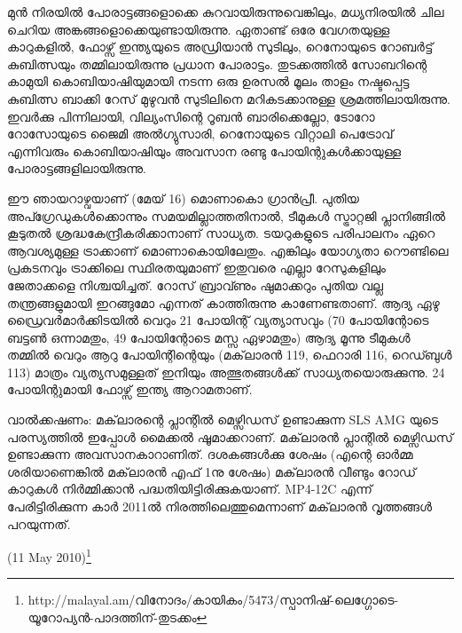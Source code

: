 മുന്‍ നിരയില്‍ പോരാട്ടങ്ങളൊക്കെ കുറവായിരുന്നുവെങ്കിലും, മധ്യനിരയില്‍ ചില ചെറിയ അങ്കങ്ങളൊക്കെയുണ്ടായിരുന്നു.
ഏതാണ്ട് ഒരേ വേഗതയുള്ള കാറുകളില്‍, ഫോഴ്സ് ഇന്ത്യയുടെ അഡ്രിയാന്‍ സുടിലും, റെനോയുടെ റോബര്‍ട്ട് കുബിത്സയും 
തമ്മിലായിരുന്നു പ്രധാന പോരാട്ടം. തുടക്കത്തില്‍ സോബറിന്റെ കാമുയി കൊബിയാഷിയുമായി നടന്ന ഒരു ഉരസല്‍ മൂലം 
താളം നഷ്ടപ്പെട്ട കുബിത്സ ബാക്കി റേസ് മുഴുവന്‍ സുടിലിനെ മറികടക്കാനുള്ള ശ്രമത്തിലായിരുന്നു. ഇവര്‍ക്കു പിന്നിലായി, 
വില്യംസിന്റെ റൂബന്‍ ബാരിക്കെല്ലോ, ടോറോ റോസോയുടെ ജൈമി അല്‍ഗ്യുസാരി, റെനോയുടെ വിറ്റാലി പെട്രോവ് 
എന്നിവരും കൊബിയാഷിയും അവസാന രണ്ടു പോയിന്റുകള്‍ക്കായുള്ള പോരാട്ടങ്ങളിലായിരുന്നു.

ഈ ഞായറാഴ്വയാണ് (മേയ് 16) മൊണാകൊ ഗ്രാന്‍പ്രീ. പുതിയ അപ്ഗ്രേഡുകള്‍ക്കൊന്നും സമയമില്ലാത്തതിനാല്‍, 
ടീമുകള്‍ സ്ട്രാറ്റജി പ്ലാനിങ്ങില്‍ കൂടുതല്‍ ശ്രദ്ധകേന്ദ്രീകരിക്കാനാണ് സാധ്യത. ടയറുകളുടെ പരിപാലനം ഏറെ ആവശ്യമുള്ള 
ട്രാക്കാണ് മൊണാകൊയിലേതും. എങ്കിലും യോഗ്യതാ റൌണ്ടിലെ പ്രകടനവും ട്രാക്കിലെ സ്ഥിരതയുമാണ് ഇതുവരെ 
എല്ലാ റേസുകളിലും ജേതാക്കളെ നിശ്ചയിച്ചത്. റോസ് ബ്രാവ്ണും ഷുമാക്കറും പുതിയ വല്ല തന്ത്രങ്ങളുമായി ഇറങ്ങുമോ
എന്നത് കാത്തിരുന്നു കാണേണ്ടതാണ്. ആദ്യ ഏഴു ഡ്രൈവര്‍മാര്‍ക്കിടയില്‍ വെറും 21 പോയിന്റ് വ്യത്യാസവും 
(70 പോയിന്റോടെ ബട്ടണ്‍ ഒന്നാമതും, 49 പോയിന്റോടെ മസ്സ ഏഴാമതും) ആദ്യ മൂന്നു ടീമുകള്‍ തമ്മില്‍ വെറും ആറു 
പോയിന്റിന്റെയും (മക്‌ലാരന്‍ 119, ഫെറാരി 116, റെഡ്ബുള്‍ 113) മാത്രം വ്യത്യസമുള്ളത് ഇനിയും അത്ഭുതങ്ങള്‍ക്ക് 
സാധ്യതയൊരുക്കുന്നു. 24 പോയിന്റുമായി ഫോഴ്സ് ഇന്ത്യ ആറാമതാണ്.

വാല്‍ക്കഷണം: മക്‌ലാരന്റെ പ്ലാന്റില്‍ മെഴ്സിഡസ് ഉണ്ടാക്കുന്ന SLS AMG യുടെ പരസ്യത്തില്‍ ഇപ്പോള്‍ മൈക്കല്‍ 
ഷൂമാക്കറാണ്. മക്‌ലാരന്‍ പ്ലാന്റില്‍ മെഴ്സിഡസ് ഉണ്ടാക്കുന്ന അവസാനകാറാണിത്. ദശകങ്ങള്‍ക്കു ശേഷം (എന്റെ 
ഓര്‍മ്മ ശരിയാണെങ്കില്‍ മക്‌ലാരന്‍ എഫ് 1നു ശേഷം) മക്‌ലാരന്‍ വീണ്ടും റോഡ് കാറുകള്‍ നിര്‍മ്മിക്കാന്‍ 
പദ്ധതിയിട്ടിരിക്കുകയാണ്. MP4-12C എന്ന് പേരിട്ടിരിക്കുന്ന കാര്‍ 2011ല്‍ നിരത്തിലെത്തുമെന്നാണ് മക്‌ലാരന്‍ 
വൃത്തങ്ങള്‍ പറയുന്നത്.

(11 May 2010)\footnote{http://malayal.am/വിനോദം/കായികം/5473/സ്പാനിഷ്-ലെഗ്ഗോടെ-യൂറോപ്യന്‍-പാദത്തിന്-തുടക്കം}

\newpage
